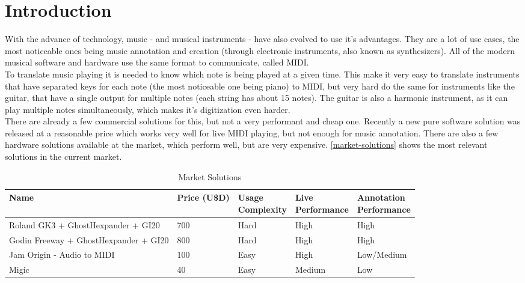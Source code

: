 \chapter[Introduction]{Introduction}

With the advance of technology, music - and musical instruments - have also evolved to
use it's advantages. They are a lot of use cases, the most noticeable ones being music
annotation and creation (through electronic instruments, also known as synthesizers).
All of the modern musical software and hardware use the same format to communicate,
called MIDI. \\
To translate music playing it is needed to know which note is being played at a
given time. This make it very easy to translate instruments that have separated
keys for each note (the most noticeable one being piano) to MIDI, but very hard
do the same for instruments like the guitar, that have a single output for multiple
notes (each string has about 15 notes). The guitar is also a harmonic instrument,
as it can play multiple notes simultaneously, which makes it's digitization even harder.\\
There are already a few commercial solutions for this, but not a very performant
and cheap one. Recently a new pure software solution was released at a reasonable
price which works very well for live MIDI playing, but not enough for music annotation.
There are also a few hardware solutions available at the market, which perform well,
but are very expensive. \autoref{market-solutions} shows the most relevant solutions
in the current market.

\begin{table}[htb]
  \begin{center}
    \ABNTEXreducedfont
    \caption[Market Solutions]{Market Solutions}
    \label{market-solutions}
    \begin{tabular}{m{4cm} | m{1cm} | m{2cm} | m{2cm} | m{2cm} }
      \hline
      Name & Price (U\$D) & \pbox{2cm}{Usage\\Complexity} & \pbox{2cm}{Live\\Performance} & \pbox{2cm}{Annotation\\Performance}\\
      \hline \hline
      Roland GK3 + GhostHexpander + GI20 & 700 & Hard & High & High \\
      Godin Freeway + GhostHexpander + GI20 & 800 & Hard & High & High \\
      Jam Origin - Audio to MIDI & 100 & Easy & High & Low/Medium \\
      Migic & 40 & Easy & Medium & Low \\
      \hline
    \end{tabular}
  \end{center}
\end{table}
